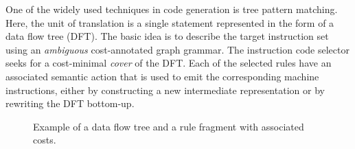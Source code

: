 One of the widely used techniques in code generation is tree pattern
matching. Here, the unit of translation is a single statement
represented in the form of a data flow tree (DFT). The basic idea is
to describe the target instruction set using an \emph{ambiguous}
cost-annotated graph grammar. The instruction code selector seeks for a
cost-minimal \emph{cover} of the DFT. Each of the selected rules have
an associated semantic action that is used to emit the corresponding
machine instructions, either by constructing a new intermediate
representation or by rewriting the DFT bottom-up.
\begin{figure}[ht]
  \begin{center}
  \end{center}
  \caption{Example of a data flow tree and a rule fragment with
    associated costs.}\label{fig:tpm}
\end{figure}


